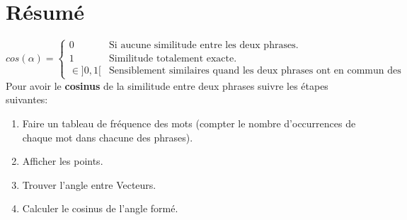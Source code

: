 \documentclass[a4paper, 14pt]{article}
\begin{document}
    \section{Résumé}
	  \[
	  cos(\alpha) =
	  \begin{cases}
	  	0&\text{Si aucune similitude entre les deux phrases.}\\
	  	1 & \text{Similitude totalement exacte.}\\
	  	\in ]0, 1[ & \text{Sensiblement similaires quand les deux phrases ont en commun des mots.}
 	  \end{cases}
	  \]
		Pour avoir le \textbf{cosinus} de la similitude entre deux phrases suivre les étapes suivantes:
		\begin{enumerate}
			\item Faire un tableau de fréquence des mots (compter le nombre d'occurrences de chaque mot dans chacune des phrases).
			\item  Afficher les points.
			\item Trouver l'angle entre Vecteurs.
			\item Calculer le cosinus de l'angle formé.
		\end{enumerate}
\end{document}
